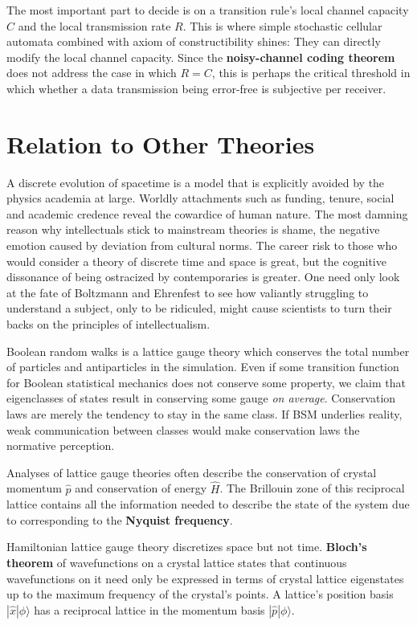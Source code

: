 \documentclass[10pt, a5paper, twoside, openright]{memoir}
\begin{document}
The most important part to decide is on a transition rule's local channel capacity $C$ and the local transmission rate $R$. This is where simple stochastic cellular automata combined with axiom of constructibility shines: They can directly modify the local channel capacity. Since the \textbf{noisy-channel coding theorem} does not address the case in which $R = C$, this is perhaps the critical threshold in which whether a data transmission being error-free is subjective per receiver.


\chapter{Relation to Other Theories}
A discrete evolution of spacetime is a model that is explicitly avoided by the physics academia at large. Worldly attachments such as funding, tenure, social and academic credence reveal the cowardice of human nature. The most damning reason why intellectuals stick to mainstream theories is shame, the negative emotion caused by deviation from cultural norms. The career risk to those who would consider a theory of discrete time and space is great, but the cognitive dissonance of being ostracized by contemporaries is greater. One need only look at the fate of Boltzmann and Ehrenfest to see how valiantly struggling to understand a subject, only to be ridiculed, might cause scientists to turn their backs on the principles of intellectualism.

Boolean random walks is a lattice gauge theory which conserves the total number of particles and antiparticles in the simulation. Even if some transition function for Boolean statistical mechanics does not conserve some property, we claim that eigenclasses of states result in conserving some gauge \textit{on average}. Conservation laws are merely the tendency to stay in the same class. If BSM underlies reality, weak communication between classes would make conservation laws the normative perception.

Analyses of lattice gauge theories often describe the conservation of crystal momentum $\hat p$ and conservation of energy $\hat H$. The Brillouin zone of this reciprocal lattice contains all the information needed to describe the state of the system due to corresponding to the \textbf{Nyquist frequency}.

Hamiltonian lattice gauge theory discretizes space but not time. \textbf{Bloch's theorem} of wavefunctions on a crystal lattice states that continuous wavefunctions on it need only be expressed in terms of crystal lattice eigenstates up to the maximum frequency of the crystal's points. A lattice's position basis $| \hat x | \phi \rangle$ has a reciprocal lattice in the momentum basis $| \hat p | \phi \rangle$.
\end{document}
